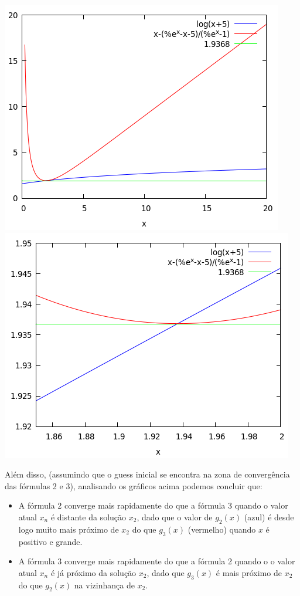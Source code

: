 \begin{center} 
\includegraphics[scale=0.45]{2017E_3_3_02}
\includegraphics[scale=0.45]{2017E_3_3_03}
\end{center}
Além disso, (assumindo que o guess inicial se encontra na zona de convergência das fórmulas 2 e 3), analisando os gráficos acima podemos concluir que:
\begin{itemize}
    \item A fórmula 2 converge mais rapidamente do que a fórmula 3 quando o valor atual $x_n$ é distante da solução $x_2$, dado que o valor de $g_2(x)$ (azul) é desde logo muito mais próximo de $x_2$ do que $g_3(x)$ (vermelho) quando $x$ é positivo e grande.
    \item A fórmula 3 converge mais rapidamente do que a fórmula 2 quando o o valor atual $x_n$ é já próximo da solução $x_2$, dado que $g_3(x)$ é mais próximo de $x_2$ do que $g_2(x)$ na vizinhança de $x_2$.
\end{itemize}
